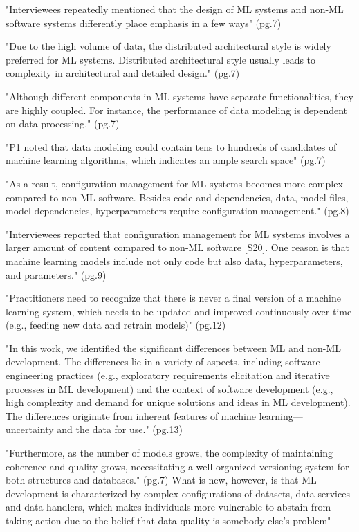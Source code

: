 
\parencite{Wan2021HowPractices}

"Interviewees repeatedly mentioned that the design of ML systems and non-ML
software systems differently place emphasis in a few ways" (pg.7)

"Due to the high volume of data, the distributed architectural style is widely
preferred for ML systems. Distributed architectural style usually leads to
complexity in architectural and detailed design." (pg.7)

"Although different components in ML systems have separate functionalities,
they are highly coupled. For instance, the performance of data modeling is
dependent on data processing." (pg.7)

"P1 noted that data modeling could contain tens to hundreds of candidates of
machine learning algorithms, which indicates an ample search space" (pg.7)

"As a result, configuration management for ML systems becomes more complex
compared to non-ML software. Besides code and dependencies, data, model files,
model dependencies, hyperparameters require configuration management." (pg.8)

"Interviewees reported that configuration management for ML systems involves a
larger amount of content compared to non-ML software [S20]. One reason is that
machine learning models include not only code but also data, hyperparameters,
and parameters." (pg.9)

"Practitioners need to recognize that there is never a final version of a
machine learning system, which needs to be updated and improved continuously
over time (e.g., feeding new data and retrain models)" (pg.12)

"In this work, we identified the significant differences between ML and non-ML
development. The differences lie in a variety of aspects, including software
engineering practices (e.g., exploratory requirements elicitation and iterative
processes in ML development) and the context of software development (e.g., high
complexity and demand for unique solutions and ideas in ML development). The
differences originate from inherent features of machine learning— uncertainty
and the data for use." (pg.13)


\parencite{Wazir2023MLOps:Review}

"Furthermore, as the number of models grows, the complexity of maintaining
coherence and quality grows, necessitating a well-organized versioning system
for both structures and databases." (pg.7) What is new, however, is that ML
development is characterized by complex configurations of datasets, data
services and data handlers, which makes individuals more vulnerable to abstain
from taking action due to the belief that data quality is somebody else’s
problem"